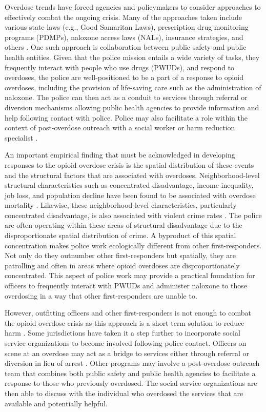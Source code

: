 Overdose trends have forced agencies and policymakers to consider approaches to effectively combat the ongoing crisis. Many of the approaches taken include various state laws (e.g., Good Samaritan Laws), prescription drug monitoring programs (PDMPs), naloxone access laws (NALs), insurance strategies, and others \parencite{haegerich_evidence_2019}. One such approach is collaboration between public safety and public health entities. Given that the police mission entails a wide variety of tasks, they frequently interact with people who use drugs (PWUDs), and respond to overdoses, the police are well-positioned to be a part of a response to opioid overdoses, including the provision of life-saving care such as the administration of naloxone. The police can then act as a conduit to services through referral or diversion mechanisms allowing public health agencies to provide information and help following contact with police.  Police may also facilitate a role within the context of post-overdose outreach with a social worker or harm reduction specialist \parencite{bagley_scoping_2019}.

An important empirical finding that must be acknowledged in developing responses to the opioid overdose crisis is the spatial distribution of these events and the structural factors that are associated with overdoses. Neighborhood-level structural characteristics such as concentrated disadvantage, income inequality, job loss, and population decline have been found to be associated with overdose mortality \parencite{carter_spatial_2019, feldmeyer_community_2022, ford_neighborhood_2017, piza_drug_2023}. Likewise, these neighborhood-level characteristics, particularly concentrated disadvantage, is also associated with violent crime rates \parencite{peterson_divergent_2010}. The police are often operating within these areas of structural disadvantage due to the disproportionate spatial distribution of crime. A byproduct of this spatial concentration makes police work ecologically different from other first-responders. Not only do they outnumber other first-responders \parencite{lurigio_opioid_2018} but spatially, they are patrolling and often in areas where opioid overdoses are disproportionately concentrated. This aspect of police work may provide a practical foundation for officers to frequently interact with PWUDs and administer naloxone to those overdosing in a way that other first-responders are unable to.

However, outfitting officers and other first-responders is not enough to combat the opioid overdose crisis as this approach is a short-term solution to reduce harm \parencite{goodison_law_2019}. Some jurisdictions have taken it a step further to incorporate social service organizations to become involved following police contact. Officers on scene at an overdose may act as a bridge to services either through referral or diversion in lieu of arrest \parencite{collins_seattles_2017, paul_meeting_2018}. Other programs may involve a post-overdose outreach team that combines both public safety and public health agencies to facilitate a response to those who previously overdosed. The social service organizations are then able to discuss with the individual who overdosed the services that are available and potentially helpful. 

